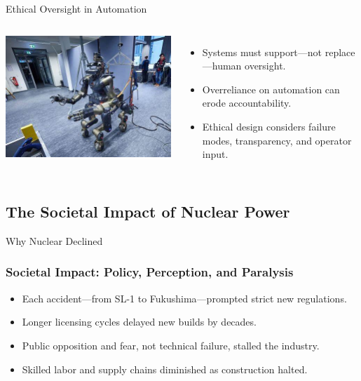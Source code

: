 \documentclass{beamer}
\begin{document}
\begin{frame}{Ethical Oversight in Automation}
  \begin{columns}
  \includegraphics[width=\textwidth]{ethicaldesign.jpg}
  \begin{itemize}
    \item Systems must support—not replace—human oversight.
    \item Overreliance on automation can erode accountability.
    \item Ethical design considers failure modes, transparency, and operator input.
  \end{itemize}
\end{columns}
\end{frame}


\subsection{The Societal Impact of Nuclear Power}
\begin{frame}{Why Nuclear Declined}
  \subsubsection*{Societal Impact: Policy, Perception, and Paralysis}
  \begin{itemize}
    \item Each accident—from SL-1 to Fukushima—prompted strict new regulations.
    \item Longer licensing cycles delayed new builds by decades.
    \item Public opposition and fear, not technical failure, stalled the industry.
    \item Skilled labor and supply chains diminished as construction halted.
  \end{itemize}
\end{frame}
\end{document}
